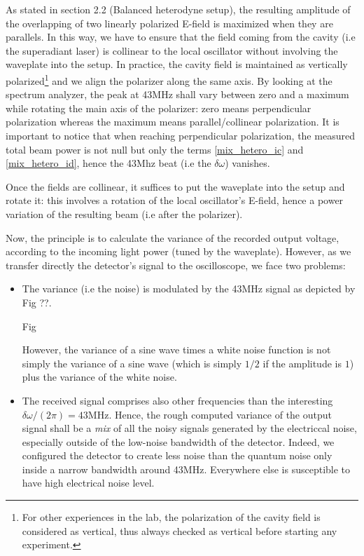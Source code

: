 \documentclass[12pt]{report}
\begin{document}
As stated in section 2.2 (Balanced heterodyne setup), the resulting amplitude of the overlapping of two linearly polarized E-field is maximized when they are parallels. In this way, we have to ensure that the field coming from the cavity (i.e the superadiant laser) is collinear to the local oscillator without involving the waveplate into the setup. In practice, the cavity field is maintained as vertically polarized\footnote{For other experiences in the lab, the polarization of the cavity field is considered as vertical, thus always checked as vertical before starting any experiment.} and we align the polarizer along the same axis. By looking at the spectrum analyzer, the peak at 43MHz shall vary between zero and a maximum while rotating the main axis of the polarizer: zero means perpendicular polarization whereas the maximum means parallel/collinear polarization. It is important to notice that when reaching perpendicular polarization, the measured total beam power is not null but only the terms \eqref{mix_hetero_ic} and \eqref{mix_hetero_id}, hence the 43Mhz beat (i.e the $\delta\omega$) vanishes.

Once the fields are collinear, it suffices to put the waveplate into the setup and rotate it: this involves a rotation of the local oscillator's E-field, hence a power variation of the resulting beam (i.e after the polarizer).

Now, the principle is to calculate the variance of the recorded output voltage, according to the incoming light power (tuned by the waveplate). However, as we transfer directly the detector's signal to the oscilloscope, we face two problems:
\begin{itemize}
	\item The variance (i.e the noise) is modulated by the 43MHz signal as depicted by Fig ??.
	
	Fig
	
	However, the variance of a sine wave times a white noise function is not simply the variance of a sine wave (which is simply $1/2$ if the amplitude is $1$) plus the variance of the white noise.
	\item The received signal comprises also other frequencies than the interesting $\delta\omega/(2\pi) = 43$MHz. Hence, the rough computed variance of the output signal shall be a \textit{mix} of all the noisy signals generated by the electriccal noise, especially outside of the low-noise bandwidth of the detector. Indeed, we configured the detector to create less noise than the quantum noise only inside a narrow bandwidth around 43MHz. Everywhere else is susceptible to have high electrical noise level.
\end{itemize}
\end{document}
